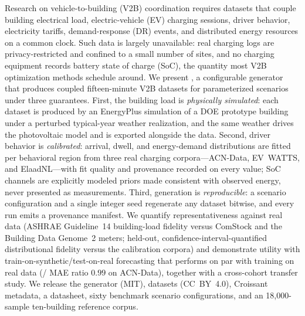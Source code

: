 Research on vehicle-to-building (V2B) coordination requires datasets that
couple building electrical load, electric-vehicle (EV) charging sessions,
driver behavior, electricity tariffs, demand-response (DR) events, and
distributed energy resources on a common clock. Such data is largely
unavailable: real charging logs are privacy-restricted and confined to a small
number of sites, and no charging equipment records battery state of charge
(SoC), the quantity most V2B optimization methods schedule around. We present
\generator{}, a configurable generator that produces coupled fifteen-minute
V2B datasets for parameterized scenarios under three guarantees. First, the
building load is \emph{physically simulated}: each dataset is produced by an
EnergyPlus simulation of a DOE prototype building under a perturbed
typical-year weather realization, and the same weather drives the photovoltaic
model and is exported alongside the data. Second, driver behavior is
\emph{calibrated}: arrival, dwell, and energy-demand distributions are fitted
per behavioral region from three real charging corpora---ACN-Data, EV~WATTS,
and ElaadNL---with fit quality and provenance recorded on every value; SoC
channels are explicitly modeled priors made consistent with observed energy,
never presented as measurements. Third, generation is \emph{reproducible}: a
scenario configuration and a single integer seed regenerate any dataset
bitwise, and every run emits a provenance manifest. We quantify
representativeness against real data (ASHRAE Guideline~14 building-load
fidelity versus ComStock and the Building Data Genome~2 meters; held-out,
confidence-interval-quantified distributional fidelity versus the calibration
corpora) and demonstrate utility with train-on-synthetic/test-on-real
forecasting that performs on par with training on real data
(\tstr{}/\trtr{} MAE ratio $0.99$ on ACN-Data), together with a cross-cohort
transfer study. We release the generator (MIT), datasets (CC~BY~4.0),
Croissant metadata, a datasheet, sixty benchmark scenario configurations, and
an 18{,}000-sample ten-building reference corpus.
